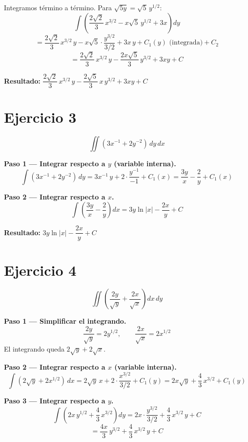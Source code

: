 \documentclass[12pt,a4paper]{article}
\newcommand{\resultado}[1]{%
  \textcolor{resultcolor}{\textbf{Resultado: } $\displaystyle #1$}%
}
\begin{document}
Integramos término a término. Para $\sqrt{5y} = \sqrt{5}\,y^{1/2}$:
\[
  \int \left(\frac{2\sqrt{2}}{3}\,x^{3/2} - x\sqrt{5}\,y^{1/2} + 3x\right) dy
\]
\[
  = \frac{2\sqrt{2}}{3}\,x^{3/2}\,y - x\sqrt{5}\cdot\frac{y^{3/2}}{3/2} + 3x\,y + C_1(y)\text{ (integrada)} + C_2
\]
\[
  = \frac{2\sqrt{2}}{3}\,x^{3/2}\,y - \frac{2x\sqrt{5}}{3}\,y^{3/2} + 3xy + C
\]

\medskip
\resultado{\dfrac{2\sqrt{2}}{3}\,x^{3/2}\,y - \dfrac{2\sqrt{5}}{3}\,x\,y^{3/2} + 3xy + C}

\bigskip
\section*{Ejercicio 3}
\[
  \iint (3x^{-1} + 2y^{-2}) \, dy \, dx
\]

\textbf{Paso 1 — Integrar respecto a $y$ (variable interna).}
\[
  \int (3x^{-1} + 2y^{-2})\,dy = 3x^{-1}\,y + 2\cdot\frac{y^{-1}}{-1} + C_1(x)
  = \frac{3y}{x} - \frac{2}{y} + C_1(x)
\]

\textbf{Paso 2 — Integrar respecto a $x$.}
\[
  \int \left(\frac{3y}{x} - \frac{2}{y}\right) dx
  = 3y\ln|x| - \frac{2x}{y} + C
\]

\medskip
\resultado{3y\ln|x| - \dfrac{2x}{y} + C}

\bigskip
\section*{Ejercicio 4}
\[
  \iint \left(\frac{2y}{\sqrt{y}} + \frac{2x}{\sqrt{x}}\right) dx \, dy
\]

\textbf{Paso 1 — Simplificar el integrando.}
\[
  \frac{2y}{\sqrt{y}} = 2y^{1/2}, \qquad
  \frac{2x}{\sqrt{x}} = 2x^{1/2}
\]
El integrando queda $2\sqrt{y} + 2\sqrt{x}$.

\textbf{Paso 2 — Integrar respecto a $x$ (variable interna).}
\[
  \int (2\sqrt{y} + 2x^{1/2})\,dx
  = 2\sqrt{y}\,x + 2\cdot\frac{x^{3/2}}{3/2} + C_1(y)
  = 2x\sqrt{y} + \frac{4}{3}\,x^{3/2} + C_1(y)
\]

\textbf{Paso 3 — Integrar respecto a $y$.}
\[
  \int \left(2x\,y^{1/2} + \frac{4}{3}\,x^{3/2}\right) dy
  = 2x\cdot\frac{y^{3/2}}{3/2} + \frac{4}{3}\,x^{3/2}\,y + C
\]
\[
  = \frac{4x}{3}\,y^{3/2} + \frac{4}{3}\,x^{3/2}\,y + C
\]
\end{document}
